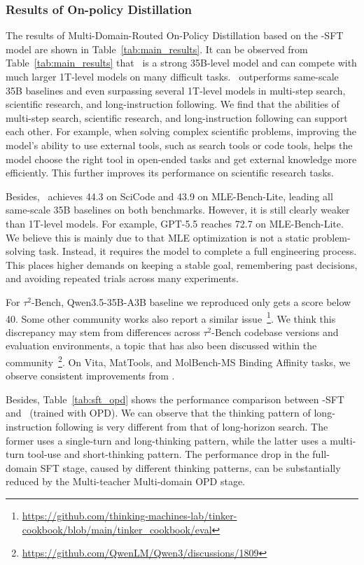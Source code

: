 

\subsubsection{Results of On-policy Distillation} 



The results of Multi-Domain-Routed On-Policy Distillation based on the \ProjectName-SFT model are shown in Table~\ref{tab:main_results}. It can be observed from Table~\ref{tab:main_results} that \ProjectName~is a strong 35B-level model and can compete with much larger 1T-level models on many difficult tasks. \ProjectName~outperforms same-scale 35B baselines and even surpassing several 1T-level models in multi-step search, scientific research, and long-instruction following. We find that the abilities of multi-step search, scientific research, and long-instruction following can support each other. For example, when solving complex scientific problems, improving the model’s ability to use external tools, such as search tools or code tools, helps the model choose the right tool in open-ended tasks and get external knowledge more efficiently. This further improves its performance on scientific research tasks.

Besides, \ProjectName~achieves 44.3 on SciCode and 43.9 on MLE-Bench-Lite, leading all same-scale 35B baselines on both benchmarks. However, it is still clearly weaker than 1T-level models. For example, GPT-5.5 reaches 72.7 on MLE-Bench-Lite. We believe this is mainly due to that MLE optimization is not a static problem-solving task. Instead, it requires the model to complete a full engineering process. This places higher demands on keeping a stable goal, remembering past decisions, and avoiding repeated trials across many experiments.

For $\tau^2$-Bench, Qwen3.5-35B-A3B baseline we reproduced only gets a score below 40. Some other community works also report a similar issue~\footnote{\url{https://github.com/thinking-machines-lab/tinker-cookbook/blob/main/tinker_cookbook/eval}}. We think this discrepancy may stem from differences across $\tau^2$-Bench codebase versions and evaluation environments, a topic that has also been discussed within the community~\footnote{\url{https://github.com/QwenLM/Qwen3/discussions/1809}}.
On Vita, MatTools, and MolBench-MS Binding Affinity tasks, we observe consistent improvements from \ProjectName.

Besides, Table~\ref{tab:sft_opd} shows the performance comparison between \ProjectName-SFT and \ProjectName~(trained with OPD). We can observe that the thinking pattern of long-instruction following is very different from that of long-horizon search. The former uses a single-turn and long-thinking pattern, while the latter uses a multi-turn tool-use and short-thinking pattern. The performance drop in the full-domain SFT stage, caused by different thinking patterns, can be substantially reduced by the Multi-teacher Multi-domain OPD stage. 

